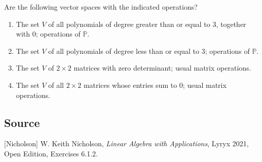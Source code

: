 \documentclass{ximera}
\author{}
\begin{document}
\begin{exercise}
Are the following vector spaces with the indicated operations?
\begin{enumerate}
    \item The set $V$ of all polynomials of degree greater than or equal to 3, together with 0; operations of $\mathbb{P}$.

    \begin{multipleChoice}
 \end{multipleChoice}

 \item The set $V$ of all polynomials of degree less than or equal to 3; operations of $\mathbb{P}$.

 \begin{multipleChoice}
 \end{multipleChoice}

 \item The set $V$ of $2 \times 2$ matrices with zero determinant; usual matrix operations.

\begin{multipleChoice}
 \end{multipleChoice}

 \item The set $V$ of all $2 \times 2$ matrices whose entries sum to 0; usual matrix operations.

 \begin{multipleChoice}
 \end{multipleChoice}
 
\end{enumerate}
 \end{exercise}

\subsection*{Source}
[Nicholson] W. Keith Nicholson, {\it Linear Algebra with Applications}, Lyryx 2021, Open Edition, Exercises 6.1.2.  
\end{document}
